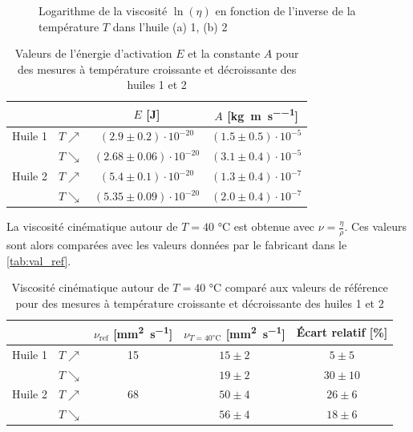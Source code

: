 \begin{figure}[h]
\begin{subfigure}{0.48\linewidth}
        \caption{}
        \label{fig:huile2_lneta}
    \end{subfigure}
    \caption{Logarithme de la viscosité \(\ln(\eta)\) en fonction de l'inverse de la température \(T\) dans l'huile (a) 1, (b) 2}
\end{figure}

\begin{table}[h]
    \centering
    \begin{tabulary}{0.8\linewidth}{C C|C C}
        \toprule
        & & \(E\) [\si{\joule}] & \(A\) [\si{\kilo\gram\per\meter\per\second}] \\
        \midrule
        Huile 1 & \(T \nearrow\) & \((2.9 \pm 0.2) \cdot 10^{-20}\) & \((1.5 \pm 0.5) \cdot 10^{-5}\) \\
        & \(T \searrow\) & \((2.68 \pm 0.06) \cdot 10^{-20}\) & \((3.1 \pm 0.4) \cdot 10^{-5}\) \\
        \midrule
        Huile 2 & \(T \nearrow\) & \((5.4 \pm 0.1) \cdot 10^{-20}\) & \((1.3 \pm 0.4) \cdot 10^{-7}\) \\
        & \(T \searrow\) & \((5.35 \pm 0.09) \cdot 10^{-20}\) & \((2.0 \pm 0.4) \cdot 10^{-7}\) \\
        \bottomrule
    \end{tabulary}
    \caption{Valeurs de l'énergie d'activation \(E\) et la constante \(A\) pour des mesures à température croissante et décroissante des huiles 1 et 2}
    \label{tab:energie_fit}
\end{table}

La viscosité cinématique autour de \(T = 40\) \si{\celsius} est obtenue avec \(\nu = \frac{\eta}{\rho}\). Ces valeurs sont alors comparées avec les valeurs données par le fabricant dans le \autoref{tab:val_ref}.

\begin{table}[h]
    \centering
    \begin{tabulary}{0.8\linewidth}{C C|C|C C}
        \toprule
        & & \(\nu_\textrm{ref}\) [\si{\square\milli\meter\per\second}] & \(\nu_{T=40 \si{\celsius}}\) [\si{\square\milli\meter\per\second}] & Écart relatif [\%] \\
        \midrule
        Huile 1 & \(T \nearrow\) & 15 & \(15 \pm 2\) & \(5 \pm 5\) \\
        & \(T \searrow\) &  & \(19 \pm 2\) & \(30 \pm 10\) \\
        \midrule
        Huile 2 & \(T \nearrow\) & 68 & \(50 \pm 4\) & \(26 \pm 6\)\\
        & \(T \searrow\) &  & \(56 \pm 4\) & \(18 \pm 6\) \\
        \bottomrule
    \end{tabulary}
    \caption{Viscosité cinématique autour de \(T = 40\) \si{\celsius} comparé aux valeurs de référence \cite{val_ref} pour des mesures à température croissante et décroissante des huiles 1 et 2}
    \label{tab:val_ref}
\end{table}
